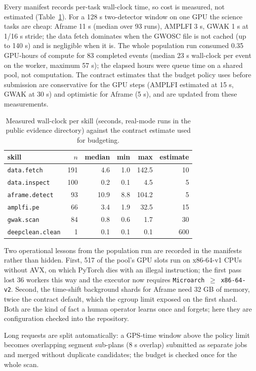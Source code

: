 \documentclass[twocolumn]{aastex631}
\begin{document}
Every manifest records per-task wall-clock time, so cost is measured, not
estimated (Table~\ref{tab:cost}). For a 128 s two-detector window on one
GPU the science tasks are cheap: Aframe 11 s (median over 93 runs), AMPLFI
3 s, GWAK 1 s at 1/16 s stride; the data fetch dominates when the GWOSC
file is not cached (up to 140 s) and is negligible when it is. The whole
population run consumed 0.35 GPU-hours of compute for 83 completed events
(median 23 s wall-clock per event on the worker, maximum 57 s); the
elapsed hours were queue time on a shared pool, not computation. The
contract estimates that the budget policy uses before submission are
conservative for the GPU steps (AMPLFI estimated at 15 s, GWAK at 30 s) and
optimistic for Aframe (5 s), and are updated from these measurements.

\begin{table}
\centering
\caption{Measured wall-clock per skill (seconds, real-mode runs in the
public evidence directory) against the contract estimate used for
budgeting.}
\label{tab:cost}
\begin{tabular}{lrrrrr}
\toprule
skill & $n$ & median & min & max & estimate \\
\midrule
\texttt{data.fetch} & 191 & 4.6 & 1.0 & 142.5 & 10 \\
\texttt{data.inspect} & 100 & 0.2 & 0.1 & 4.5 & 5 \\
\texttt{aframe.detect} & 93 & 10.9 & 8.8 & 104.2 & 5 \\
\texttt{amplfi.pe} & 66 & 3.4 & 1.9 & 32.5 & 15 \\
\texttt{gwak.scan} & 84 & 0.8 & 0.6 & 1.7 & 30 \\
\texttt{deepclean.clean} & 1 & 0.1 & 0.1 & 0.1 & 600 \\
\bottomrule
\end{tabular}
\end{table}

Two operational lessons from the population run are recorded in the
manifests rather than hidden. First, 517 of the pool's GPU slots run on
x86-64-v1 CPUs without AVX, on which PyTorch dies with an illegal
instruction; the first pass lost 36 workers this way and the executor now
requires \texttt{Microarch $\geq$ x86-64-v2}. Second, the time-shift
background shards for Aframe need 32 GB of memory, twice the contract
default, which the cgroup limit exposed on the first shard. Both are the
kind of fact a human operator learns once and forgets; here they are
configuration checked into the repository.

Long requests are split automatically: a GPS-time window above the policy
limit becomes overlapping segment sub-plans (8 s overlap) submitted as
separate jobs and merged without duplicate candidates; the budget is
checked once for the whole scan.
\end{document}
